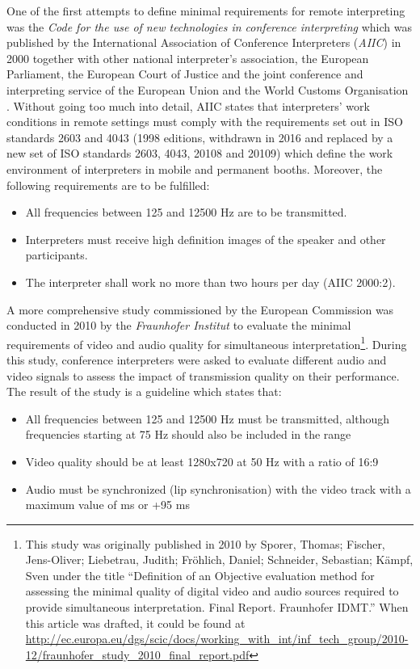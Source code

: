 \documentclass[output=paper]{langsci/langscibook}
\begin{document}
One of the first attempts to define minimal requirements for remote interpreting was the \textit{Code for the use of new technologies in conference interpreting} which was published by the International Association of Conference Interpreters (\textit{AIIC}) in 2000 together with other national interpreter’s association, the European Parliament, the European Court of Justice and the joint conference and interpreting service of the European Union and the World Customs Organisation \citep[31]{Korak2010}. Without going too much into detail, AIIC states that interpreters’ work conditions in remote settings must comply with the requirements set out in \textsc{ISO} standards 2603 and 4043 (1998 editions, withdrawn in 2016 and replaced by a new set of \textsc{ISO} standards 2603, 4043, 20108 and 20109) which define the work environment of interpreters in mobile and permanent booths. Moreover, the following requirements are to be fulfilled:

\begin{itemize}
\item All frequencies between 125 and 12500 Hz are to be transmitted.
\item Interpreters must receive high definition images of the speaker and other participants. 
\item The interpreter shall work no more than two hours per day (AIIC 2000:2).
\end{itemize}

A more comprehensive study commissioned by the European Commission was conducted in 2010 by the \textit{Fraunhofer Institut} to evaluate the minimal requirements of video and audio quality for simultaneous interpretation\footnote{This study was originally published in 2010 by Sporer, Thomas; Fischer, Jens-Oliver; Liebetrau, Judith; Fröhlich, Daniel; Schneider, Sebastian; Kämpf, Sven under the title “Definition of an Objective evaluation method for assessing the minimal quality of digital video and audio sources required to provide simultaneous interpretation. Final Report. Fraunhofer IDMT.” When this article was drafted, it could be found at \url{http://ec.europa.eu/dgs/scic/docs/working_with_int/inf_tech_group/2010-12/fraunhofer_study_2010_final_report.pdf}}. During this study, conference interpreters were asked to evaluate different audio and video signals to assess the impact of transmission quality on their performance. The result of the study is a guideline which states that:

\begin{itemize}
\item All frequencies between 125 and 12500 Hz must be transmitted, although frequencies starting at 75 Hz should also be included in the range
\item Video quality should be at least 1280x720 at 50 Hz with a ratio of 16:9
\item Audio must be synchronized (lip synchronisation) with the video track with a maximum value of  ms or +95 ms
\end{itemize}
\end{document}
